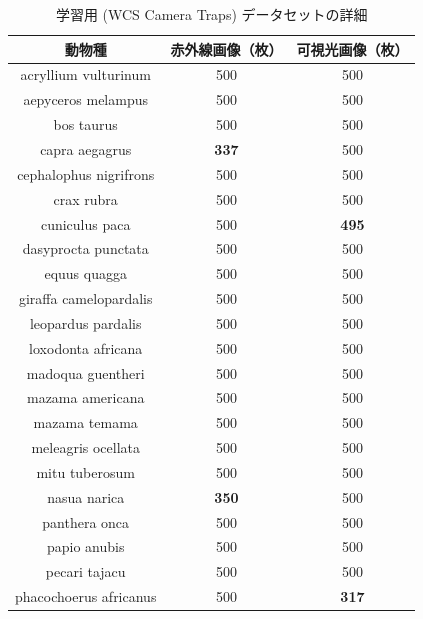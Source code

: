 \begin{table}[tbp]
  \centering
  \caption{学習用 (WCS Camera Traps) データセットの詳細}
  \label{tbl:wcs}
  \begin{tabular}{c|c|c}
      \hline
      動物種                    & 赤外線画像（枚） & 可視光画像（枚） \\ \hline\hline
      acryllium vulturinum     & 500          & 500          \\
      aepyceros melampus       & 500          & 500          \\
      bos taurus               & 500          & 500          \\
      capra aegagrus           & \textbf{337} & 500          \\
      cephalophus nigrifrons   & 500          & 500          \\
      crax rubra               & 500          & 500          \\
      cuniculus paca           & 500          & \textbf{495} \\
      dasyprocta punctata      & 500          & 500          \\
      equus quagga             & 500          & 500          \\
      giraffa camelopardalis   & 500          & 500          \\
      leopardus pardalis       & 500          & 500          \\
      loxodonta africana       & 500          & 500          \\
      madoqua guentheri        & 500          & 500          \\
      mazama americana         & 500          & 500          \\
      mazama temama            & 500          & 500          \\
      meleagris ocellata       & 500          & 500          \\
      mitu tuberosum           & 500          & 500          \\
      nasua narica             & \textbf{350} & 500          \\
      panthera onca            & 500          & 500          \\
      papio anubis             & 500          & 500          \\
      pecari tajacu            & 500          & 500          \\
      phacochoerus africanus   & 500          & \textbf{317} \\

\end{tabular}
\end{table}
